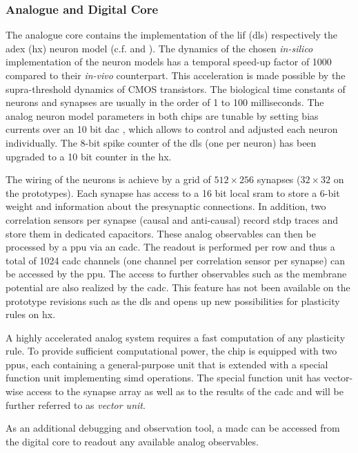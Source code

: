 \subsubsection*{Analogue and Digital Core}
The analogue core contains the implementation of the \gls{lif} (\gls{dls}) respectively the \gls{adex} (\gls{hx}) neuron model (c.f. \cite{aamir2018dls2neuron} and \cite{aamir2018mixed}). The dynamics of the chosen \textit{in-silico} implementation of the neuron models has a temporal speed-up factor of 1000 compared to their \textit{in-vivo} counterpart. This acceleration is made possible by the supra-threshold dynamics of CMOS transistors. The biological time constants of neurons and synapses are usually in the order of 1 to 100 milliseconds. The analog neuron model parameters in both chips are tunable by setting bias currents over an 10 bit \gls{dac} \cite{hock13analogmemory}, which allows to control and adjusted each neuron individually. The 8-bit spike counter of the \gls{dls} (one per neuron) has been upgraded to a 10 bit counter in the \gls{hx}. 

The wiring of the neurons is achieve by a grid of $512 \times 256$ synapses ($32 \times 32$ on the prototypes). Each synapse has access to a 16 bit local \gls{sram} to store a 6-bit weight and information about the presynaptic connections. In addition, two correlation sensors per synapse (causal and anti-causal) record \gls{stdp} traces and store them in dedicated capacitors. These analog observables can then be processed by a \gls{ppu} via an \gls{cadc}. The readout is performed per row and thus a total of 1024 \gls{cadc} channels (one channel per correlation sensor per synapse) can be accessed by the \gls{ppu}. The access to further observables such as the membrane potential are also realized by the \gls{cadc}. This feature has not been available on the prototype revisions such as the \gls{dls} and opens up new possibilities for plasticity rules on \gls{hx}.

A highly accelerated analog system requires a fast computation of any plasticity rule. To provide sufficient computational power, the chip is equipped with two \glspl{ppu}, each containing a general-purpose unit that is extended with a special function unit implementing \gls{simd} operations. The special function unit has vector-wise access to the synapse array as well as to the results of the \gls{cadc} and will be further referred to as \emph{vector unit}.

As an additional debugging and observation tool, a \gls{madc} can be accessed from the digital core to readout any available analog observables.

